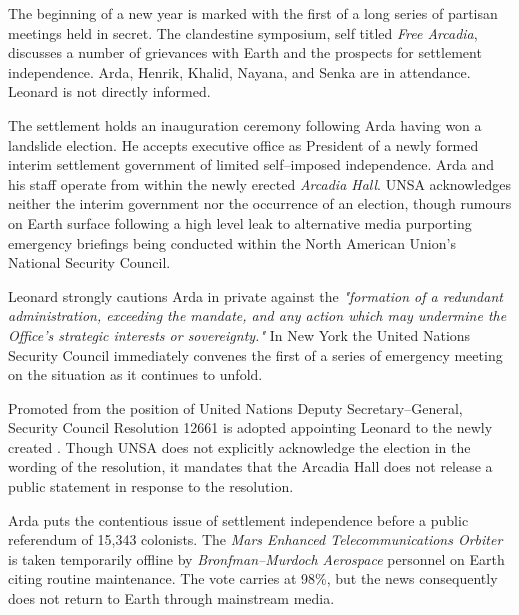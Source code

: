 

The beginning of a new year is marked with the first of a long series of partisan meetings held in secret. The clandestine symposium, self titled {\it Free Arcadia}, discusses a number of grievances with Earth and the prospects for settlement independence. Arda, Henrik, Khalid, Nayana, and Senka are in attendance. Leonard is not directly informed.
\StopTimelineDate

The settlement holds an inauguration ceremony following Arda having won a landslide election. He accepts executive office as President of a newly formed interim settlement government of limited self--imposed independence. Arda and his staff operate from within the newly erected {\it Arcadia Hall}. UNSA acknowledges neither the interim government nor the occurrence of an election, though rumours on Earth surface following a high level leak to alternative media purporting emergency briefings being conducted within the North American Union's National Security Council.

Leonard strongly cautions Arda in private against the {\it "formation of a redundant administration, exceeding the mandate, and any action which may undermine the Office's strategic interests or sovereignty."} In New York the United Nations Security Council immediately convenes the first of a series of emergency meeting on the situation as it continues to unfold.
\StopTimelineDate

Promoted from the position of United Nations Deputy Secretary--General, Security Council Resolution 12661 is adopted appointing Leonard to the newly created . Though UNSA does not explicitly acknowledge the election in the wording of the resolution, it mandates that the  Arcadia Hall does not release a public statement in response to the resolution.
\StopTimelineDate

Arda puts the contentious issue of settlement independence before a public referendum of 15,343 colonists. The {\it Mars Enhanced Telecommunications Orbiter} is taken temporarily offline by {\it Bronfman--Murdoch Aerospace} personnel on Earth citing routine maintenance. The vote carries at 98\%, but the news consequently does not return to Earth through mainstream media.
\StopTimelineDate

